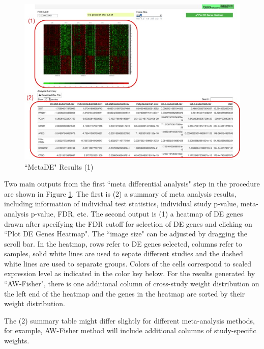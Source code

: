 \begin{figure}[H]
\begin{center}
\includegraphics[scale=0.45]{./figure/metaDE/metaDEresult1.jpg}
\caption{``MetaDE" Results (1)}
\label{fig:MetaDEresult1}
\end{center}
\end{figure}

Two main outputs from the first ``meta differential analysis" step in the procedure are shown in Figure \ref{fig:MetaDEresult1}. The first is (2) a summary of meta analysis results, including information of individual test statistics, individual study p-value, meta-analysis p-value, FDR, etc. The second output is (1) a heatmap of DE genes drawn after specifying the FDR cutoff for selection of DE genes and clicking on ``Plot DE Genes Heatmap". The ``image size" can be adjusted by dragging the scroll bar. In the heatmap, rows refer to DE genes selected, columns refer to samples, solid white lines are used to sepate different studies and the dashed white lines are used to separate groups. Colors of the cells correspond to scaled expression level as indicated in the color key below. For the results generated by ``AW-Fisher", there is one additional column of cross-study weight distribution on the left end of the heatmap and the genes in the heatmap are sorted by their weight distribution.

The (2) summary table might differ slightly for different meta-analysis methods, for example, AW-Fisher method will include additional columns of study-specific weights.  

